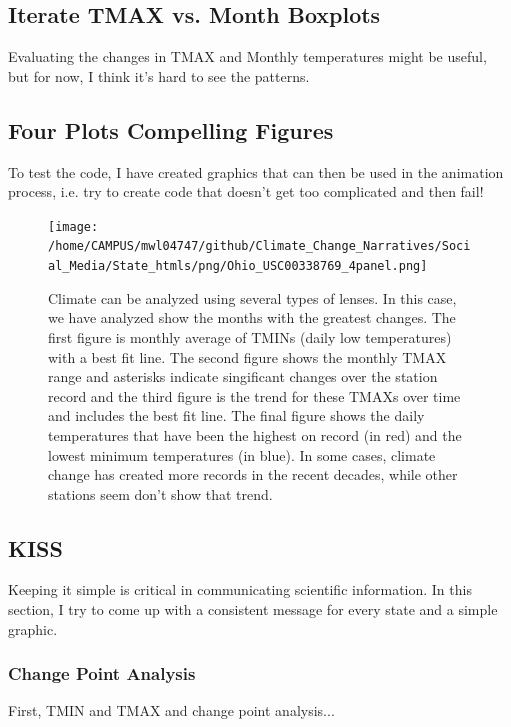 \documentclass{article}\usepackage[]{graphicx}\usepackage[]{color}
\begin{document}
\subsection{Iterate TMAX vs. Month Boxplots}

Evaluating the changes in TMAX and Monthly temperatures might be useful, but for now, I think it's hard to see the patterns. 




\subsection{Four Plots Compelling Figures}

To test the code, I have created graphics that can then be used in the animation process, i.e. try to create code that doesn't get too complicated and then fail! 



\begin{figure}
\texttt{[image: /home/CAMPUS/mwl04747/github/Climate\_Change\_Narratives/Social\_Media/State\_htmls/png/Ohio\_USC00338769\_4panel.png]}
\caption{Climate can be analyzed using several types of lenses. In this case, we have analyzed show the months with the greatest changes. The first figure is monthly average of TMINs (daily low temperatures) with a best fit line. The second figure shows the monthly TMAX range and asterisks indicate singificant changes over the station record and the third figure is the trend for these TMAXs over time and includes the best fit line. The final figure shows the daily temperatures that have been the highest on record (in red) and the lowest minimum temperatures (in blue). In some cases, climate change has created more records in the recent decades, while other stations seem don't show that trend.}
\label{fig:4panel}
\end{figure}

\subsection{KISS}

Keeping it simple is critical in communicating scientific information. In this section, I try to come up with a consistent message for every state and a simple graphic. 

\subsubsection{Change Point Analysis}
First, TMIN and TMAX and change point analysis...
\end{document}
